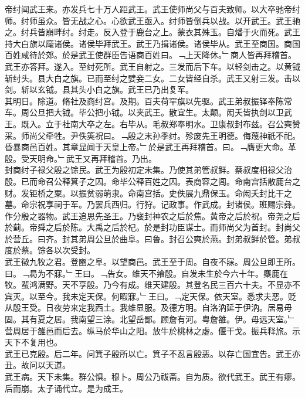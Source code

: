\documentclass{zhvt-classic}
\begin{document}
\hspace*{2em}帝纣闻武王来。亦发兵七十万人距武王。武王使师尚父与百夫致师。以大卒驰帝纣师。纣师虽众。皆无战之心。心欲武王亟入。纣师皆倒兵以战。以开武王。武王驰之。纣兵皆崩畔纣。纣走。反入登于鹿台之上。蒙衣其殊玉。自燔于火而死。武王持大白旗以麾诸侯。诸侯毕拜武王。武王乃揖诸侯。诸侯毕从。武王至商国。商国百姓咸待於郊。於是武王使群臣告语商百姓曰。﹁上天降休。﹂商人皆再拜稽首。武王亦答拜。遂入。至纣死所。武王自射之。三发而后下车。以轻剑击之。以黄钺斩纣头。县大白之旗。已而至纣之嬖妾二女。二女皆经自杀。武王又射三发。击以剑。斩以玄钺。县其头小白之旗。武王已乃出复军。\\
\hspace*{2em}其明日。除道。脩社及商纣宫。及期。百夫荷罕旗以先驱。武王弟叔振铎奉陈常车。周公旦把大钺。毕公把小钺。以夹武王。散宜生。太颠。闳夭皆执剑以卫武王。既入。立于社南大卒之左。右毕从。毛叔郑奉明水。卫康叔封布兹。召公奭赞采。师尚父牵牲。尹佚筴祝曰。﹁殷之末孙季纣。殄废先王明德。侮蔑神祇不祀。昏暴商邑百姓。其章显闻于天皇上帝。﹂於是武王再拜稽首。曰。﹁膺更大命。革殷。受天明命。﹂武王又再拜稽首。乃出。\\
\hspace*{2em}封商纣子禄父殷之馀民。武王为殷初定未集。乃使其弟管叔鲜。蔡叔度相禄父治殷。已而命召公释箕子之囚。命毕公释百姓之囚。表商容之闾。命南宫括散鹿台之财。发钜桥之粟。以振贫弱萌隶。命南宫括。史佚展九鼎保玉。命闳夭封比干之墓。命宗祝享祠于军。乃罢兵西归。行狩。记政事。作武成。封诸侯。班赐宗彝。作分殷之器物。武王追思先圣王。乃襃封神农之后於焦。黄帝之后於祝。帝尧之后於蓟。帝舜之后於陈。大禹之后於杞。於是封功臣谋士。而师尚父为首封。封尚父於营丘。曰齐。封其弟周公旦於曲阜。曰鲁。封召公奭於燕。封弟叔鲜於管。弟叔度於蔡。馀各以次受封。\\
\hspace*{2em}武王徵九牧之君。登豳之阜。以望商邑。武王至于周。自夜不寐。周公旦即王所。曰。﹁曷为不寐。﹂王曰。﹁告女。维天不飨殷。自发未生於今六十年。麋鹿在牧。蜚鸿满野。天不享殷。乃今有成。维天建殷。其登名民三百六十夫。不显亦不宾灭。以至今。我未定天保。何暇寐。﹂王曰。﹁定天保。依天室。悉求夫恶。贬从殷王受。日夜劳来定我西土。我维显服。及德方明。自洛汭延于伊汭。居易毋固。其有夏之居。我南望三涂。北望岳鄙。顾詹有河。粤詹雒。伊。毋远天室。﹂营周居于雒邑而后去。纵马於华山之阳。放牛於桃林之虚。偃干戈。振兵释旅。示天下不复用也。\\
\hspace*{2em}武王已克殷。后二年。问箕子殷所以亡。箕子不忍言殷恶。以存亡国宜告。武王亦丑。故问以天道。\\
\hspace*{2em}武王病。天下未集。群公惧。穆卜。周公乃祓斋。自为质。欲代武王。武王有瘳。后而崩。太子诵代立。是为成王。\\
\end{document}
